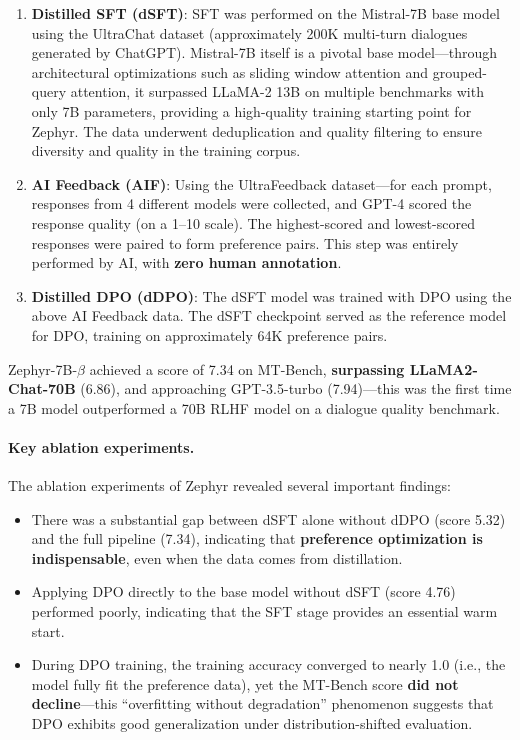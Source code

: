 \begin{enumerate}[leftmargin=2em]
  \item \textbf{Distilled SFT (dSFT)}:
    SFT was performed on the Mistral-7B \cite{jiang2023mistral} base model using the UltraChat dataset (approximately 200K multi-turn dialogues generated by ChatGPT).
    Mistral-7B itself is a pivotal base model---through architectural optimizations such as sliding window attention and grouped-query attention,
    it surpassed LLaMA-2 13B on multiple benchmarks with only 7B parameters,
    providing a high-quality training starting point for Zephyr.
    The data underwent deduplication and quality filtering to ensure diversity and quality in the training corpus.

  \item \textbf{AI Feedback (AIF)}:
    Using the UltraFeedback dataset---for each prompt, responses from 4 different models were collected,
    and GPT-4 scored the response quality (on a 1--10 scale).
    The highest-scored and lowest-scored responses were paired to form preference pairs.
    This step was entirely performed by AI, with \textbf{zero human annotation}.

  \item \textbf{Distilled DPO (dDPO)}:
    The dSFT model was trained with DPO using the above AI Feedback data.
    The dSFT checkpoint served as the reference model for DPO,
    training on approximately 64K preference pairs.
\end{enumerate}

\noindent
Zephyr-7B-$\beta$ achieved a score of 7.34 on MT-Bench,
\textbf{surpassing LLaMA2-Chat-70B} (6.86),
and approaching GPT-3.5-turbo (7.94)---this was the first time a 7B model outperformed a 70B RLHF model on a dialogue quality benchmark.

\paragraph{Key ablation experiments.}
The ablation experiments of Zephyr revealed several important findings:
\begin{itemize}[leftmargin=2em]
  \item There was a substantial gap between dSFT alone without dDPO (score 5.32) and the full pipeline (7.34),
    indicating that \textbf{preference optimization is indispensable},
    even when the data comes from distillation.
  \item Applying DPO directly to the base model without dSFT (score 4.76) performed poorly,
    indicating that the SFT stage provides an essential warm start.
  \item During DPO training, the training accuracy converged to nearly 1.0 (i.e., the model fully fit the preference data),
    yet the MT-Bench score \textbf{did not decline}---this ``overfitting without degradation'' phenomenon suggests
    that DPO exhibits good generalization under distribution-shifted evaluation.
\end{itemize}


